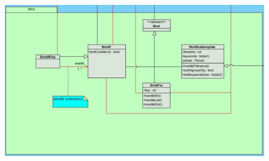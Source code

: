\documentclass[11pt]{report}
\begin{document}
\begin{figure}[!ht]
    \centering
    \includegraphics[width=\linewidth]{assets/dir_stmt.png}
\end{figure}
%
%
%
% 
% 


\end{document}
